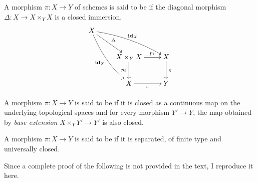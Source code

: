 \begin{definition}
    A morphism $\pi:X\to Y$ of schemes is said to be  if the diagonal morphism $\Delta: X\to X\times_Y X$ is a closed immersion.
    \begin{equation*}
        \xymatrix{
            X\ar[rd]^\Delta\ar@/^/[rrd]^{\id_X}\ar@/_/[rdd]_{\id_X} & & \\
            & X\times_Y X\ar[r]^-{p_1}\ar[d]_{p_2} & X\ar[d]^{\pi}\\
            & X\ar[r]_\pi & Y
        }
    \end{equation*}
\end{definition}

\begin{definition}
    A morphism $\pi: X\to Y$ is said to be  if it is closed as a continuous map on the underlying topological spaces and for every morphism $Y'\to Y$, the map obtained by \emph{base extension} $X\times_Y Y'\to Y'$ is also closed.
\end{definition}

\begin{definition}
    A morphism $\pi: X\to Y$ is said to be  if it is separated, of finite type and universally closed.
\end{definition}

Since a complete proof of the following is not provided in the text, I reproduce it here.

